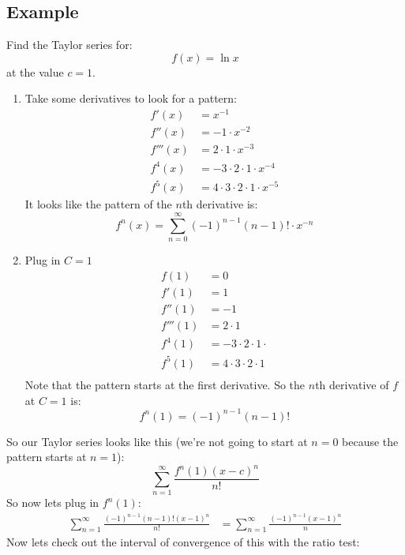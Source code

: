 \documentclass{report}
\begin{document}
    \subsection{Example}
        Find the Taylor series for:
        \[f(x) = \ln x\]
        at the value \(c = 1\).
        \begin{enumerate}
            \item Take some derivatives to look for a pattern:
            \begin{align*}
                f'(x) &= x^{-1} \\
                f''(x) &= -1 \cdot x^{-2} \\
                f'''(x) &= 2 \cdot 1 \cdot x^{-3} \\
                f^4(x) &= -3 \cdot 2 \cdot 1 \cdot x^{-4} \\
                f^5(x) &= 4 \cdot 3 \cdot 2 \cdot 1 \cdot x^{-5}
            \end{align*}
            It looks like the pattern of the \(n\)th derivative is:
            \[f^n(x) = \sum_{n=0}^{\infty} (-1)^{n-1}(n-1)! \cdot x^{-n}\]
            \item Plug in \(C = 1\)
            \begin{align*}
                f(1) &= 0 \\
                f'(1) &= 1 \\
                f''(1) &= -1 \\
                f'''(1) &= 2 \cdot 1 \\
                f^4(1) &= - 3 \cdot 2 \cdot 1 \cdot \\
                f^5(1) &= 4 \cdot 3 \cdot 2 \cdot 1 \\
            \end{align*}
            Note that the pattern starts at the first derivative.
            So the \(n\)th derivative of \(f\) at \(C = 1\) is:
            \[f^n(1) = (-1)^{n-1}(n-1)!\]
        \end{enumerate}
        So our Taylor series looks like this (we're not going to start at \(n = 0\) because the pattern starts at \(n = 1\)):
        \[\sum_{n=1}^{\infty} \frac{f^n(1) (x-c)^n}{n!}\]
        So now lets plug in \(f^n(1)\):
        \begin{align*}
            \sum_{n = 1}^{\infty} \frac{(-1)^{n-1}(n-1)!(x-1)^n}{n!}
            &= \sum_{n = 1}^{\infty} \frac{(-1)^{n-1}(x-1)^n}{n}
        \end{align*}
        Now lets check out the interval of convergence of this with the ratio test:
\end{document}
